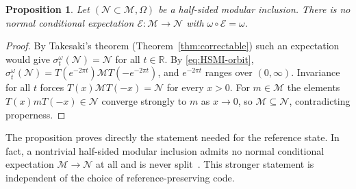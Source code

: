 \documentclass[a4paper,11pt]{article}
\newtheorem{proposition}[theorem]{Proposition}
\theoremstyle{definition}
\newcommand{\mN}{\mathcal{N}}
\newcommand{\mM}{\mathcal{M}}
\newcommand{\mE}{\mathcal{E}}
\begin{document}
\begin{proposition}\label{prop:no-vacuum-expectation}
Let $(\mN\subset\mM,\Omega)$ be a half-sided modular inclusion. There is no normal conditional expectation $\mE:\mM\to\mN$ with $\omega\circ\mE=\omega$.
\end{proposition}

\begin{proof}
By Takesaki's theorem (Theorem~\ref{thm:correctable}) such an expectation would give $\sigma^{\omega}_t(\mN)=\mN$ for all $t\in\mathbb R$. By \eqref{eq:HSMI-orbit}, $\sigma^\omega_t(\mN)=T(e^{-2\pi t})\mM T(-e^{-2\pi t})$, and $e^{-2\pi t}$ ranges over $(0,\infty)$. Invariance for all $t$ forces $T(x)\mM T(-x)=\mN$ for every $x>0$. For $m\in\mM$ the elements $T(x)mT(-x)\in\mN$ converge strongly to $m$ as $x\to0$, so $\mM\subseteq\mN$, contradicting properness.
\end{proof}

The proposition proves directly the statement needed for the reference state. In fact, a nontrivial half-sided modular inclusion admits no normal conditional expectation $\mM\to\mN$ at all and is never split~\cite[Section~2]{LechnerScotford2022}. This stronger statement is independent of the choice of reference-preserving code.
\end{document}
